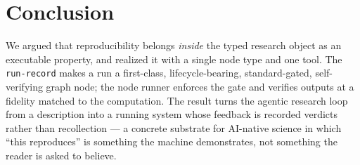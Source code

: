 \documentclass[preprint]{glimmer-paper}
\newcommand{\code}[1]{\texttt{#1}}
\begin{document}
\section{Conclusion}
We argued that reproducibility belongs \emph{inside} the typed research object as an
executable property, and realized it with a single node type and one tool. The
\code{run-record} makes a run a first-class, lifecycle-bearing, standard-gated, self-verifying
graph node; the node runner enforces the gate and verifies outputs at a fidelity matched to
the computation. The result turns the agentic research loop from a description into a running
system whose feedback is recorded verdicts rather than recollection --- a concrete substrate
for AI-native science in which ``this reproduces'' is something the machine demonstrates, not
something the reader is asked to believe.



\end{document}
